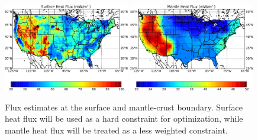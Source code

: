 \documentclass[a4paper,10pt]{article}
\begin{document}
\begin{figure}[h]
\includegraphics[width=0.49\textwidth]{HeatMapUSAr-crop.pdf} \quad
\includegraphics[width=0.49\textwidth]{MantleFlux-crop.pdf}
\caption{Flux estimates at the surface and mantle-crust boundary.  Surface heat flux will be used as a hard constraint for optimization, while mantle heat flux will be treated as a less weighted constraint.}
\end{figure}
  
\end{document}
